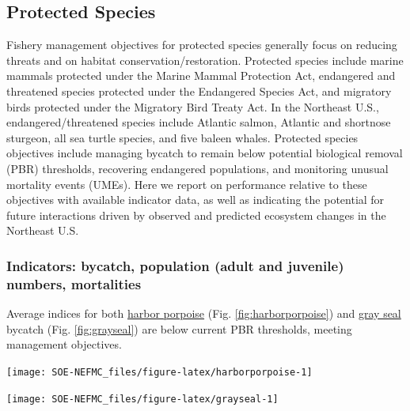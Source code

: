 \documentclass[
  10pt,
]{article}
\let\origfigure\figure
\let\endorigfigure\endfigure
\renewenvironment{figure}[1][2] {
    \expandafter\origfigure\expandafter[H]
} {
    \endorigfigure
}
\begin{document}
\hypertarget{protected-species}{%
\subsection{Protected Species}\label{protected-species}}

Fishery management objectives for protected species generally focus on reducing threats and on habitat conservation/restoration. Protected species include marine mammals protected under the Marine Mammal Protection Act, endangered and threatened species protected under the Endangered Species Act, and migratory birds protected under the Migratory Bird Treaty Act. In the Northeast U.S., endangered/threatened species include Atlantic salmon, Atlantic and shortnose sturgeon, all sea turtle species, and five baleen whales. Protected species objectives include managing bycatch to remain below potential biological removal (PBR) thresholds, recovering endangered populations, and monitoring unusual mortality events (UMEs). Here we report on performance relative to these objectives with available indicator data, as well as indicating the potential for future interactions driven by observed and predicted ecosystem changes in the Northeast U.S.

\hypertarget{indicators-bycatch-population-adult-and-juvenile-numbers-mortalities}{%
\subsubsection{Indicators: bycatch, population (adult and juvenile) numbers, mortalities}\label{indicators-bycatch-population-adult-and-juvenile-numbers-mortalities}}

Average indices for both \href{https://noaa-edab.github.io/catalog/harborporpoise.html}{harbor porpoise} (Fig. \ref{fig:harborporpoise}) and \href{https://noaa-edab.github.io/catalog/grayseal.html}{gray seal} bycatch (Fig. \ref{fig:grayseal}) are below current PBR thresholds, meeting management objectives.

\begin{figure}

{\centering \texttt{[image: SOE-NEFMC\_files/figure-latex/harborporpoise-1]} 

}

\caption{Harbor porpoise average bycatch estimate for Mid-Atlantic and New England gillnet fisheries (blue) and the potential biological removal (red).}\label{fig:harborporpoise}
\end{figure}
\begin{figure}

{\centering \texttt{[image: SOE-NEFMC\_files/figure-latex/grayseal-1]} 

}

\caption{Gray Seal average bycatch estimate for gillnet fisheries (blue) and the potential biological removal (red).}\label{fig:grayseal}
\end{figure}
\end{document}
